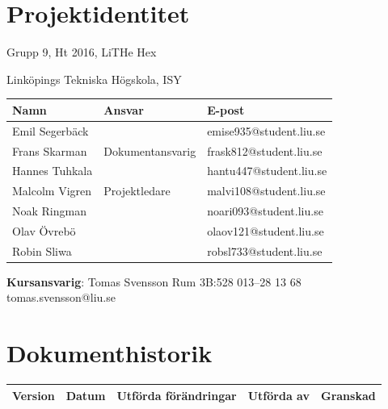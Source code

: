 \documentclass[a4paper,titlepage,12pt]{article}
\begin{document}
	\begin{center}


		\section*{Projektidentitet}
		Grupp 9, Ht 2016, LiTHe Hex

		Linköpings Tekniska Högskola, ISY

		\begin{table}[h]
			\begin{center}
				\begin{tabular}[pos]{ l l l }
					\textbf{Namn} & \textbf{Ansvar} & \textbf{E-post} \\ \midrule
					Emil Segerbäck & & emise935@student.liu.se \\ \midrule
					Frans Skarman & Dokumentansvarig & frask812@student.liu.se \\ \midrule
					Hannes Tuhkala & & hantu447@student.liu.se \\ \midrule
					Malcolm Vigren & Projektledare & malvi108@student.liu.se \\ \midrule
					Noak Ringman &  & noari093@student.liu.se \\ \midrule
					Olav Övrebö &  & olaov121@student.liu.se \\ \midrule
					Robin Sliwa &  & robsl733@student.liu.se \\
				\end{tabular}
			\end{center}
		\end{table}

		\centering
		\textbf{Kursansvarig}: Tomas Svensson Rum 3B:528 013--28 13 68 tomas.svensson@liu.se


		
		\newpage



		\section*{Dokumenthistorik}
		\begin{table}[h]
			\begin{tabular}[pos]{ l l l l l }
				\textbf{Version} & \textbf{Datum} & \textbf{Utförda förändringar} 
				& \textbf{Utförda av} & \textbf{Granskad} \\ \midrule


\end{tabular}
\end{table}
\end{center}
\end{document}
